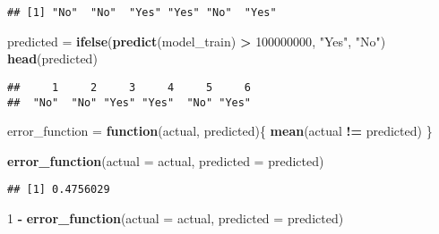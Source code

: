 \documentclass[
]{article}
\newenvironment{Shaded}{\begin{snugshade}}{\end{snugshade}}
\newcommand{\AttributeTok}[1]{\textcolor[rgb]{0.13,0.29,0.53}{#1}}
\newcommand{\ControlFlowTok}[1]{\textcolor[rgb]{0.13,0.29,0.53}{\textbf{#1}}}
\newcommand{\DecValTok}[1]{\textcolor[rgb]{0.00,0.00,0.81}{#1}}
\newcommand{\FunctionTok}[1]{\textcolor[rgb]{0.13,0.29,0.53}{\textbf{#1}}}
\newcommand{\NormalTok}[1]{#1}
\newcommand{\OtherTok}[1]{\textcolor[rgb]{0.56,0.35,0.01}{#1}}
\newcommand{\SpecialCharTok}[1]{\textcolor[rgb]{0.81,0.36,0.00}{\textbf{#1}}}
\newcommand{\StringTok}[1]{\textcolor[rgb]{0.31,0.60,0.02}{#1}}
\begin{document}
\begin{Shaded}
\end{Shaded}

\begin{verbatim}
## [1] "No"  "No"  "Yes" "Yes" "No"  "Yes"
\end{verbatim}

\begin{Shaded}
\begin{Highlighting}[]
\NormalTok{predicted }\OtherTok{=} \FunctionTok{ifelse}\NormalTok{(}\FunctionTok{predict}\NormalTok{(model\_train) }\SpecialCharTok{\textgreater{}} \DecValTok{100000000}\NormalTok{, }\StringTok{"Yes"}\NormalTok{, }\StringTok{"No"}\NormalTok{)}
\FunctionTok{head}\NormalTok{(predicted)}
\end{Highlighting}
\end{Shaded}

\begin{verbatim}
##     1     2     3     4     5     6 
##  "No"  "No" "Yes" "Yes"  "No" "Yes"
\end{verbatim}

\begin{Shaded}
\begin{Highlighting}[]
\NormalTok{error\_function }\OtherTok{=} \ControlFlowTok{function}\NormalTok{(actual, predicted)\{}
  \FunctionTok{mean}\NormalTok{(actual }\SpecialCharTok{!=}\NormalTok{ predicted)}
\NormalTok{\}}

\FunctionTok{error\_function}\NormalTok{(}\AttributeTok{actual =}\NormalTok{ actual, }\AttributeTok{predicted =}\NormalTok{ predicted)}
\end{Highlighting}
\end{Shaded}

\begin{verbatim}
## [1] 0.4756029
\end{verbatim}

\begin{Shaded}
\begin{Highlighting}[]
\DecValTok{1} \SpecialCharTok{{-}} \FunctionTok{error\_function}\NormalTok{(}\AttributeTok{actual =}\NormalTok{ actual, }\AttributeTok{predicted =}\NormalTok{ predicted)}
\end{Highlighting}
\end{Shaded}
\end{document}
